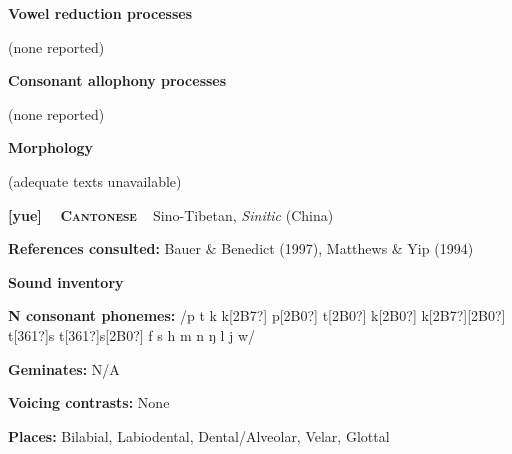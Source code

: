 \begin{styleBody}
\textbf{Vowel reduction processes}
\end{styleBody}

\begin{styleBody}
(none reported)
\end{styleBody}

\begin{styleBody}
\textbf{Consonant allophony processes}
\end{styleBody}

\begin{styleBody}
(none reported) 
\end{styleBody}

\begin{styleBody}
\textbf{Morphology}
\end{styleBody}

\begin{styleBody}
(adequate texts unavailable)
\end{styleBody}

\clearpage\begin{styleBody}
\textbf{[yue] }\ \ \textbf{\textsc{Cantonese}}\textbf{\ \ }Sino-Tibetan, \textit{Sinitic} (China)
\end{styleBody}

\begin{styleBody}
\textbf{References consulted: }Bauer \& Benedict (1997), Matthews \& Yip (1994)
\end{styleBody}

\begin{styleBody}
\textbf{Sound inventory}
\end{styleBody}

\begin{styleBody}
\textbf{N consonant phonemes: }/p t k k[2B7?] p[2B0?] t[2B0?] k[2B0?] k[2B7?][2B0?] t[361?]s t[361?]s[2B0?] f s h m n ŋ l j w/
\end{styleBody}

\begin{styleBody}
\textbf{Geminates: }N/A
\end{styleBody}

\begin{styleBody}
\textbf{Voicing contrasts: }None
\end{styleBody}

\begin{styleBody}
\textbf{Places: }Bilabial, Labiodental, Dental/Alveolar, Velar, Glottal
\end{styleBody}

